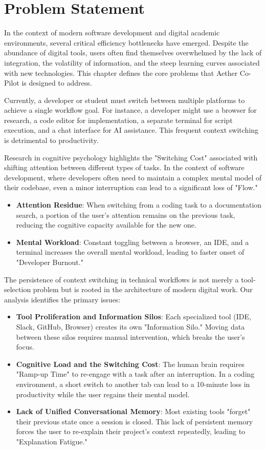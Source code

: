 \chapter{Problem Statement}

In the context of modern software development and digital academic environments, several critical efficiency bottlenecks have emerged. Despite the abundance of digital tools, users often find themselves overwhelmed by the lack of integration, the volatility of information, and the steep learning curves associated with new technologies. This chapter defines the core problems that Aether Co-Pilot is designed to address.

Currently, a developer or student must switch between multiple platforms to achieve a single workflow goal. For instance, a developer might use a browser for research, a code editor for implementation, a separate terminal for script execution, and a chat interface for AI assistance. This frequent context switching is detrimental to productivity.

Research in cognitive psychology highlights the "Switching Cost" associated with shifting attention between different types of tasks. In the context of software development, where developers often need to maintain a complex mental model of their codebase, even a minor interruption can lead to a significant loss of "Flow."
\begin{itemize}
    \item \textbf{Attention Residue}: When switching from a coding task to a documentation search, a portion of the user's attention remains on the previous task, reducing the cognitive capacity available for the new one.
    \item \textbf{Mental Workload}: Constant toggling between a browser, an IDE, and a terminal increases the overall mental workload, leading to faster onset of "Developer Burnout."
\end{itemize}

The persistence of context switching in technical workflows is not merely a tool-selection problem but is rooted in the architecture of modern digital work. Our analysis identifies the primary issues:
\begin{itemize}
    \item \textbf{Tool Proliferation and Information Silos}: Each specialized tool (IDE, Slack, GitHub, Browser) creates its own "Information Silo." Moving data between these silos requires manual intervention, which breaks the user's focus.
    \item \textbf{Cognitive Load and the Switching Cost}: The human brain requires "Ramp-up Time" to re-engage with a task after an interruption. In a coding environment, a short switch to another tab can lead to a 10-minute loss in productivity while the user regains their mental model.
    \item \textbf{Lack of Unified Conversational Memory}: Most existing tools "forget" their previous state once a session is closed. This lack of persistent memory forces the user to re-explain their project's context repeatedly, leading to "Explanation Fatigue."
\end{itemize}

